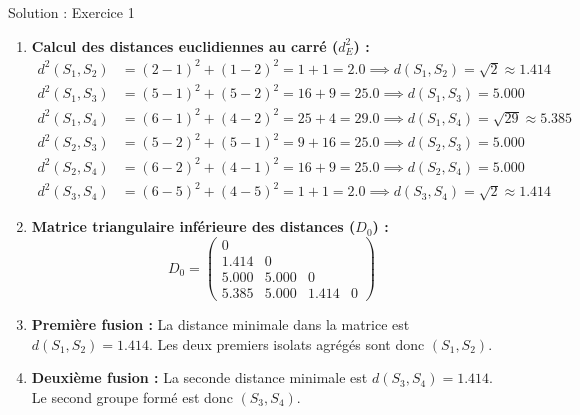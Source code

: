 \documentclass[11pt,a4paper]{article}
\begin{document}
\begin{solutionbox}{Solution : Exercice 1}
\begin{enumerate}[label=\textbf{\alph*.}]
  \item \textbf{Calcul des distances euclidiennes au carré ($d_E^2$) :}
  \begin{align*}
    d^2(S_1, S_2) &= (2-1)^2 + (1-2)^2 = 1 + 1 = \mathbf{2.0} \implies d(S_1, S_2) = \sqrt{2} \approx \mathbf{1.414} \\
    d^2(S_1, S_3) &= (5-1)^2 + (5-2)^2 = 16 + 9 = \mathbf{25.0} \implies d(S_1, S_3) = \mathbf{5.000} \\
    d^2(S_1, S_4) &= (6-1)^2 + (4-2)^2 = 25 + 4 = \mathbf{29.0} \implies d(S_1, S_4) = \sqrt{29} \approx \mathbf{5.385} \\
    d^2(S_2, S_3) &= (5-2)^2 + (5-1)^2 = 9 + 16 = \mathbf{25.0} \implies d(S_2, S_3) = \mathbf{5.000} \\
    d^2(S_2, S_4) &= (6-2)^2 + (4-1)^2 = 16 + 9 = \mathbf{25.0} \implies d(S_2, S_4) = \mathbf{5.000} \\
    d^2(S_3, S_4) &= (6-5)^2 + (4-5)^2 = 1 + 1 = \mathbf{2.0} \implies d(S_3, S_4) = \sqrt{2} \approx \mathbf{1.414}
  \end{align*}
  \item \textbf{Matrice triangulaire inférieure des distances ($D_0$) :}
  \begin{equation*}
    D_0 = \begin{pmatrix}
      0 & & & \\
      \mathbf{1.414} & 0 & & \\
      5.000 & 5.000 & 0 & \\
      5.385 & 5.000 & \mathbf{1.414} & 0
    \end{pmatrix}
  \end{equation*}
  \item \textbf{Première fusion :}
  La distance minimale dans la matrice est $d(S_1, S_2) = 1.414$. Les deux premiers isolats agrégés sont donc \textbf{$(S_1, S_2)$}.
  \item \textbf{Deuxième fusion :}
  La seconde distance minimale est $d(S_3, S_4) = 1.414$. Le second groupe formé est donc \textbf{$(S_3, S_4)$}.
\end{enumerate}
\end{solutionbox}
\end{document}

